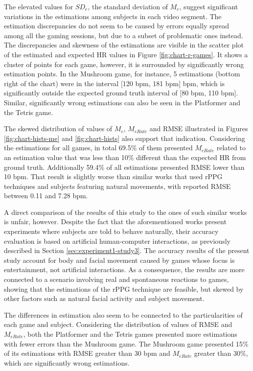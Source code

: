 The elevated values for $SD_e$, the standard deviation of $M_e$, suggest significant variations in the estimations among subjects in each video segment. The estimation discrepancies do not seem to be caused by errors equally spread among all the gaming sessions, but due to a subset of problematic ones instead. The discrepancies and skewness of the estimations are visible in the scatter plot of the estimated and expected HR values in Figure \ref{fig:chart-r-games}. It shows a cluster of points for each game, however, it is surrounded by significantly wrong estimation points. In the Mushroom game, for instance, 5 estimations (bottom right of the chart) were in the interval [120 bpm, 181 bpm] bpm, which is significantly outside the expected ground truth interval of [80 bpm, 110 bpm]. Similar, significantly wrong estimations can also be seen in the Platformer and the Tetris game.

The skewed distribution of values of $M_e$, $M_{eRate}$ and RMSE illustrated in Figures \ref{fig:chart-hists-me} and \ref{fig:chart-hists} also support that indication. Considering the estimations for all games, in total 69.5\% of them presented $M_{eRate}$ related to an estimation value that was less than 10\% different than the expected HR from ground truth. Additionally 59.4\% of all estimations presented RMSE lower than 10 bpm. That result is slightly worse than similar works that used rPPG techniques and subjects featuring natural movements, with reported RMSE between 0.11 and 7.28 bpm.

A direct comparison of the results of this study to the ones of such similar works is unfair, however. Despite the fact that the aforementioned works present experiments where subjects are told to behave naturally, their accuracy evaluation is based on artificial human-computer interactions, as previously described in Section \ref{sec:experiment1-study3}. The accuracy results of the present study account for body and facial movement caused by games whose focus is entertainment, not artificial interactions. As a consequence, the results are more connected to a scenario involving real and spontaneous reactions to games, showing that the estimations of the rPPG technique are feasible, but skewed by other factors such as natural facial activity and subject movement.

The differences in estimation also seem to be connected to the particularities of each game and subject. Considering the distribution of values of RMSE and $M_{eRate}$, both the Platformer and the Tetris games presented more estimations with fewer errors than the Mushroom game. The Mushroom game presented 15\% of its estimations with RMSE greater than 30 bpm and $M_{eRate}$ greater than 30\%, which are significantly wrong estimations.

